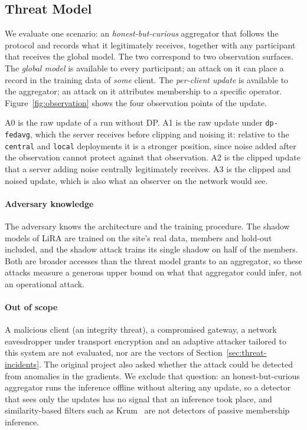 \subsection{Threat Model}
\label{sec:threat-model}

We evaluate one scenario: an \emph{honest-but-curious} aggregator that follows
the protocol and records what it legitimately receives, together with any
participant that receives the global model. The two correspond to two
observation surfaces. The \emph{global model} is available to every
participant; an attack on it can place a record in the training data of
\emph{some} client. The \emph{per-client update} is available to the
aggregator; an attack on it attributes membership to a specific operator.
Figure~\ref{fig:observation} shows the four observation points of the update.



A0 is the raw update of a run without DP. A1 is the raw update under
\texttt{dp-fedavg}, which the server receives before clipping and noising it:
relative to the \texttt{central} and \texttt{local} deployments it is a
stronger position, since noise added after the observation cannot protect
against that observation. A2 is the clipped update that a server adding noise
centrally legitimately receives. A3 is the clipped and noised update, which is
also what an observer on the network would see.

\paragraph{Adversary knowledge} The adversary knows the architecture and the
training procedure. The shadow models of LiRA are trained on the site's real
data, members and hold-out included, and the shadow attack trains its single
shadow on half of the members. Both are broader accesses than the threat model
grants to an aggregator, so these attacks measure a generous upper bound on
what that aggregator could infer, not an operational attack.

\paragraph{Out of scope} A malicious client (an integrity threat), a
compromised gateway, a network eavesdropper under transport encryption and an
adaptive attacker tailored to this system are not evaluated, nor are the
vectors of Section~\ref{sec:threat-incidents}. The original project also asked
whether the attack could be detected from anomalies in the gradients. We
exclude that question: an honest-but-curious aggregator runs the inference
offline without altering any update, so a detector that sees only the updates
has no signal that an inference took place, and similarity-based filters such
as Krum~\cite{blanchard2017machine} are not detectors of passive membership
inference.

